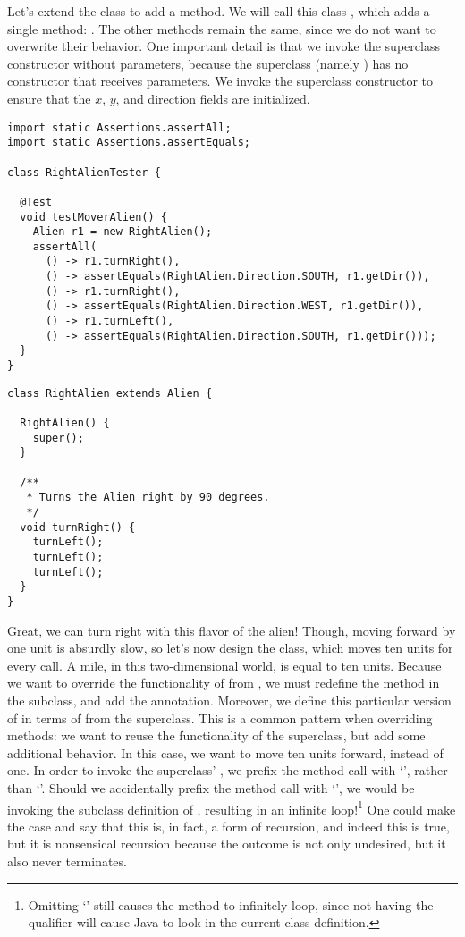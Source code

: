 Let's extend the  class to add a  method. We will call this class , which adds a single method: . The other methods remain the same, since we do not want to overwrite their behavior. One important detail is that we invoke the superclass constructor without parameters, because the superclass (namely ) has no constructor that receives parameters. We invoke the superclass constructor to ensure that the $x$, $y$, and direction fields are initialized.

\begin{lstlisting}[language=MyJava]
import static Assertions.assertAll;
import static Assertions.assertEquals;

class RightAlienTester {

  @Test
  void testMoverAlien() {
    Alien r1 = new RightAlien();
    assertAll(
      () -> r1.turnRight(),
      () -> assertEquals(RightAlien.Direction.SOUTH, r1.getDir()),
      () -> r1.turnRight(),
      () -> assertEquals(RightAlien.Direction.WEST, r1.getDir()),
      () -> r1.turnLeft(),
      () -> assertEquals(RightAlien.Direction.SOUTH, r1.getDir()));
  }
}
\end{lstlisting}

\begin{lstlisting}[language=MyJava]
class RightAlien extends Alien {

  RightAlien() { 
    super(); 
  }

  /**
   * Turns the Alien right by 90 degrees.
   */
  void turnRight() {
    turnLeft();
    turnLeft();
    turnLeft();
  }
}
\end{lstlisting}

Great, we can turn right with this flavor of the alien! 
Though, moving forward by one unit is absurdly slow, so let's now design the  class, which moves ten units for every  call. 
A mile, in this two-dimensional world, is equal to ten units. 
Because we want to override the functionality of  from , we must redefine the method in the subclass, and add the  annotation. 
Moreover, we define this particular version of  in terms of  from the superclass. 
This is a common pattern when overriding methods: we want to reuse the functionality of the superclass, but add some additional behavior. 
In this case, we want to move ten units forward, instead of one. 
In order to invoke the superclass' , we prefix the method call with `', rather than `'. 
Should we accidentally prefix the method call with `', we would be invoking the subclass definition of , resulting in an infinite loop!\footnote{Omitting `' still causes the method to infinitely loop, since not having the qualifier will cause Java to look in the current class definition.} 
One could make the case and say that this is, in fact, a form of recursion, and indeed this is true, but it is nonsensical recursion because the outcome is not only undesired, but it also never terminates.

